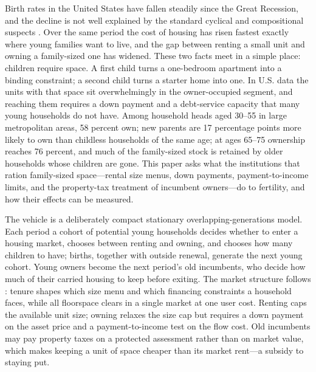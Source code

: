\documentclass[11pt]{article}
\newcommand{\1}{\mathbf 1}
\begin{document}
Birth rates in the United States have fallen steadily since the Great Recession, and the decline is not well explained by the standard cyclical and compositional suspects \citep{kearneylevinepardue2022}. Over the same period the cost of housing has risen fastest exactly where young families want to live, and the gap between renting a small unit and owning a family-sized one has widened. These two facts meet in a simple place: children require space. A first child turns a one-bedroom apartment into a binding constraint; a second child turns a starter home into one. In U.S. data the units with that space sit overwhelmingly in the owner-occupied segment, and reaching them requires a down payment and a debt-service capacity that many young households do not have. Among household heads aged 30--55 in large metropolitan areas, 58 percent own; new parents are 17 percentage points more likely to own than childless households of the same age; at ages 65--75 ownership reaches 76 percent, and much of the family-sized stock is retained by older households whose children are gone. This paper asks what the institutions that ration family-sized space---rental size menus, down payments, payment-to-income limits, and the property-tax treatment of incumbent owners---do to fertility, and how their effects can be measured.

The vehicle is a deliberately compact stationary overlapping-generations model. Each period a cohort of potential young households decides whether to enter a housing market, chooses between renting and owning, and chooses how many children to have; births, together with outside renewal, generate the next young cohort. Young owners become the next period's old incumbents, who decide how much of their carried housing to keep before exiting. The market structure follows \citet{coven2024}: tenure shapes which size menu and which financing constraints a household faces, while all floorspace clears in a single market at one user cost. Renting caps the available unit size; owning relaxes the size cap but requires a down payment on the asset price and a payment-to-income test on the flow cost. Old incumbents may pay property taxes on a protected assessment rather than on market value, which makes keeping a unit of space cheaper than its market rent---a subsidy to staying put.
\end{document}
